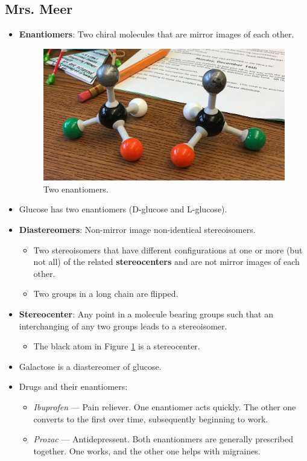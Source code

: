 \documentclass[titlepage]{article}
\numberwithin{figure}{section}
\numberwithin{table}{section}
\numberwithin{equation}{section}
\begin{document}
\subsection{Mrs. Meer}
\begin{itemize}
    \item \textbf{Enantiomers}: Two chiral molecules that are mirror images of each other.
    \begin{figure}[h!]
        \centering
        \includegraphics[width=0.4\linewidth]{Blender/enantiomers.jpg}
        \caption{Two enantiomers.}
        \label{fig:enantiomers}
    \end{figure}
    \item Glucose has two enantiomers (D-glucose and L-glucose).
    \item \textbf{Diastereomers}: Non-mirror image non-identical stereoisomers.
    \begin{itemize}
        \item Two stereoisomers that have different configurations at one or more (but not all) of the related \textbf{stereocenters} and are not mirror images of each other.
        \item Two groups in a long chain are flipped.
    \end{itemize}
    \item \textbf{Stereocenter}: Any point in a molecule bearing groups such that an interchanging of any two groups leads to a stereoisomer.
    \begin{itemize}
        \item The black atom in Figure \ref{fig:enantiomers} is a stereocenter.
    \end{itemize}
    \item Galactose is a diastereomer of glucose.
    \item Drugs and their enantiomers:
    \begin{itemize}
        \item \textit{Ibuprofen} --- Pain reliever. One enantiomer acts quickly. The other one converts to the first over time, subsequently beginning to work.
        \item \textit{Prozac} --- Antidepressent. Both enantionmers are generally prescribed together. One works, and the other one helps with migraines.

\end{itemize}
\end{itemize}
\end{document}
